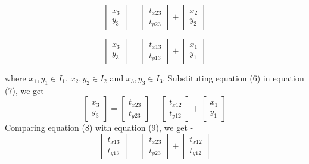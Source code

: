 \documentclass{article}
\begin{document}
\begin{enumerate}
\begin{equation}
     \begin{bmatrix}
        x_3 \\
        y_3 
    \end{bmatrix}
          =
    \begin{bmatrix}
    t_{x23} \\
    t_{y23}
    \end{bmatrix}
       + 
    \begin{bmatrix}
        x_2 \\
        y_2
    \end{bmatrix}
\end{equation}

\begin{equation}
     \begin{bmatrix}
        x_3 \\
        y_3 
    \end{bmatrix}
          =
    \begin{bmatrix}
    t_{x13} \\
    t_{y13}
    \end{bmatrix}
       +
    \begin{bmatrix}
        x_1 \\
        y_1
    \end{bmatrix}
\end{equation}

where $x_1, y_1 \in I_1$, $x_2, y_2 \in I_2$ and $x_3, y_3 \in I_3$. Substituting equation (6) in equation (7), we get -
\begin{equation}
     \begin{bmatrix}
        x_3 \\
        y_3
    \end{bmatrix}
          =
    \begin{bmatrix}
    t_{x23} \\
    t_{y23}
    \end{bmatrix}
       +
    \begin{bmatrix}
    t_{x12} \\
    t_{y12}
    \end{bmatrix}
       +
    \begin{bmatrix}
        x_1 \\
        y_1
    \end{bmatrix}
\end{equation}
Comparing equation (8) with equation (9), we get -
\begin{equation}
     \begin{bmatrix}
    t_{x13} \\
    t_{y13}
    \end{bmatrix}
          =
    \begin{bmatrix}
    t_{x23} \\
    t_{y23}
    \end{bmatrix}
       +
    \begin{bmatrix}
    t_{x12} \\
    t_{y12}
    \end{bmatrix}
\end{equation}


\end{enumerate}
\end{document}
